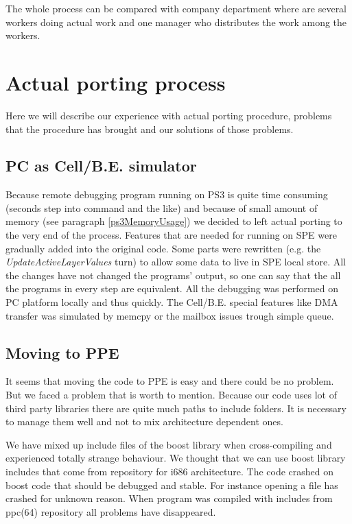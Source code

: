 \par
The whole process can be compared with company department where are several workers doing actual work and one manager who distributes the work among the workers.

\section{Actual porting process}

\par
Here we will describe our experience with actual porting procedure, problems that the procedure has brought and our solutions of those problems.

\subsection{PC as \mbox{Cell/B.E.} simulator}

\par
Because remote debugging program running on PS3 is quite time consuming (seconds step into command and the like) and because of small amount of memory (see paragraph \ref{ps3MemoryUsage}) we decided to left actual porting to the very end of the process.
Features that are needed for running on SPE were gradually added into the original code.
Some parts were rewritten (e.g. the \emph{UpdateActiveLayerValues} turn) to allow some data to live in SPE local store.
All the changes have not changed the programs' output, so one can say that the all the programs in every step are equivalent.
All the debugging was performed on PC platform locally and thus quickly.
The \mbox{Cell/B.E.} special features like DMA transfer was simulated by memcpy or the mailbox issues trough simple queue.

\subsection{Moving to PPE}

\par
It seems that moving the code to PPE is easy and there could be no problem.
But we faced a problem that is worth to mention.
Because our code uses lot of third party libraries there are quite much paths to include folders.
It is necessary to manage them well and not to mix architecture dependent ones.

\par
We have mixed up include files of the boost library when cross-compiling and experienced totally strange behaviour.
We thought that we can use boost library includes that come from repository for i686 architecture.
The code crashed on boost code that should be debugged and stable.
For instance opening a file has crashed for unknown reason.
When program was compiled with includes from ppc(64) repository all problems have disappeared.

